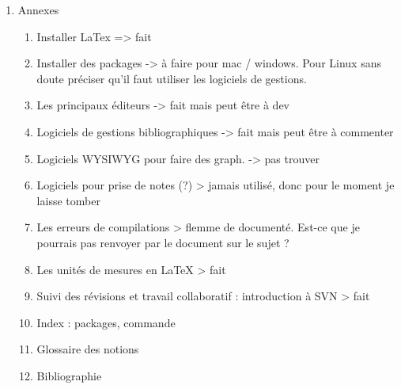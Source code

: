 \begin{enumerate}
\item{Annexes}
\begin{enumerate}
\item Installer LaTex		=> fait
\item Installer des packages							-> à faire pour mac / windows. Pour Linux sans doute préciser qu'il faut utiliser les logiciels de gestions.
\item Les principaux éditeurs							-> fait mais peut être à dev
\item Logiciels de gestions bibliographiques					-> fait mais peut être à commenter
\item Logiciels WYSIWYG pour faire des graph.				-> pas trouver
\item Logiciels pour prise de notes (?)						> jamais utilisé, donc pour le moment je laisse tomber
\item Les erreurs de compilations						> flemme de documenté. Est-ce que je pourrais pas renvoyer par le document sur le sujet ?
\item Les unités de mesures en LaTeX						> fait
\item Suivi des révisions et travail collaboratif : introduction à SVN	> fait
\item Index : packages, commande
\item Glossaire des notions
\item Bibliographie
\end{enumerate}
\end{enumerate}